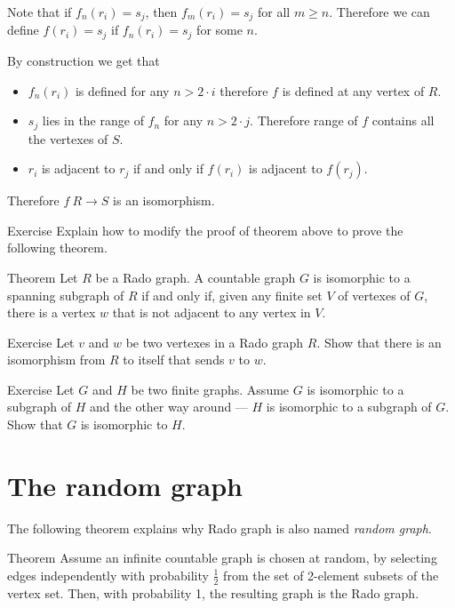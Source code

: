 Note that if $f_n(r_i)=s_j$, then $f_m(r_i)=s_j$ for all $m\ge n$.
Therefore we can define $f(r_i)=s_j$ if $f_n(r_i)=s_j$ for some $n$.


By construction we get that 
\begin{itemize}
\item $f_n(r_i)$ is defined for any $n>2\cdot i$ therefore $f$ is defined at any vertex of $R$.
\item $s_j$ lies in the range of $f_n$ for any $n>2\cdot j$.
Therefore range of $f$ contains all the vertexes of $S$.
\item $r_i$ is adjacent to $r_j$ if and only if $f(r_i)$ is adjacent to $f(r_j)$.
\end{itemize}
Therefore $f\:R\to S$ is an isomorphism.
\qeds

\begin{thm}{Exercise}
Explain how to modify the proof of theorem above to prove the following theorem.
\end{thm}


\begin{thm}{Theorem}
Let $R$ be a Rado graph.
A countable graph $G$ is isomorphic to a spanning subgraph of $R$ if and only if, given any finite set $V$ of vertexes of $G$, there is a vertex $w$ that is not adjacent to any vertex in $V$.
\end{thm}

\begin{thm}{Exercise}
Let $v$ and $w$ be two vertexes in a Rado graph $R$.
Show that there is an isomorphism from $R$ to itself that sends $v$ to $w$.
\end{thm}

\begin{thm}{Exercise}\label{ex:finite-subgraphs}
Let $G$ and $H$ be two finite graphs.
Assume $G$ is isomorphic to a subgraph of $H$ 
and the other way around --- $H$ is isomorphic to a subgraph of $G$.
Show that $G$ is isomorphic to $H$.
\end{thm}


\section*{The random graph}

The following theorem explains why Rado graph is also named {}\emph{random graph}.

\begin{thm}{Theorem}\label{thm:the-random-graph}
Assume an infinite countable graph is chosen at random, by selecting edges independently with probability $\tfrac12$ from the set of 2-element subsets of the vertex set.
Then, with probability 1, the resulting graph is the Rado graph.
\end{thm}

